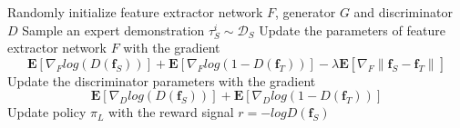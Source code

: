 \begin{algorithm}
  \caption{\TAIL{}}
  \label{ch:TAIL:alg:ProposedModel}

  \begin{algorithmic}[1]
    \Input
    \EndInput

    \State Randomly initialize feature extractor network $F$, generator $G$ and discriminator $D$
    \State Sample an expert demonstration $\tau^i_S \sim \mathcal{D}_S$
    \State Update the parameters of feature extractor network $F$ with the gradient
    \[\mathbf{E}[
        \nabla_F log(D( \mathbf{f}_S ))
      ] + \mathbf{E}[
        \nabla_F log(1 - D( \mathbf{f}_T ))
      ] - \lambda \mathbf{E}[
        \nabla_F \left\|
        \mathbf{f}_S - \mathbf{f}_T
        \right\|
      ]
    \]
    \State Update the discriminator parameters with the gradient
    \[\mathbf{E}[
        \nabla_D log(D( \mathbf{f}_S ))
      ] + \mathbf{E}[
        \nabla_D log(1 - D( \mathbf{f}_T ))
      ]\]
    \State Update policy $\pi_{L}$ with the reward signal $r=-logD(\mathbf{f}_S)$
    \EndFor

    \Output
    \EndOutput
  \end{algorithmic}
\end{algorithm}
